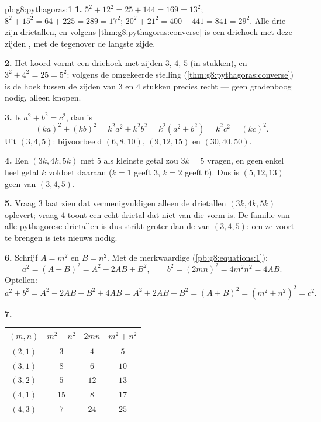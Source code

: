 \begin{solution}{pb:g8:pythagoras:1}
\textbf{1.} $5^2 + 12^2 = 25 + 144 = 169 = 13^2$; \quad
$8^2 + 15^2 = 64 + 225 = 289 = 17^2$; \quad
$20^2 + 21^2 = 400 + 441 = 841 = 29^2$. Alle drie zijn drietallen, en volgens
\cref{thm:g8:pythagoras:converse} is een driehoek met deze zijden ,
met de  tegenover de langste zijde.

\textbf{2.} Het koord vormt een driehoek met zijden $3$, $4$, $5$ (in stukken),
en $3^2 + 4^2 = 25 = 5^2$: volgens de omgekeerde stelling
(\cref{thm:g8:pythagoras:converse}) is de hoek tussen de zijden van $3$ en $4$
stukken precies recht --- geen gradenboog nodig, alleen knopen.

\textbf{3.} Is $a^2 + b^2 = c^2$, dan is
\[
(ka)^2 + (kb)^2 = k^2 a^2 + k^2 b^2
= k^2\left(a^2 + b^2\right) = k^2 c^2 = (kc)^2 .
\]
Uit $(3, 4, 5)$: bijvoorbeeld $(6, 8, 10)$, $(9, 12, 15)$ en $(30, 40, 50)$.

\textbf{4.} Een  $(3k, 4k, 5k)$ met $5$ als kleinste getal zou
$3k = 5$ vragen, en geen enkel heel getal $k$ voldoet daaraan ($k = 1$ geeft $3$,
$k = 2$ geeft $6$). Dus is $(5, 12, 13)$ geen  van $(3, 4, 5)$.

\textbf{5.} Vraag 3 laat zien dat vermenigvuldigen alleen de drietallen
$(3k, 4k, 5k)$ oplevert; vraag 4 toont een echt drietal dat niet van die vorm is.
De familie van alle pythagorese drietallen is dus strikt groter dan de 
van $(3, 4, 5)$: om ze voort te brengen is iets nieuws nodig.

\textbf{6.} Schrijf $A = m^2$ en $B = n^2$. Met de merkwaardige 
(\cref{pb:g8:equations:1}):
\[
a^2 = (A - B)^2 = A^2 - 2AB + B^2,
\qquad
b^2 = (2mn)^2 = 4m^2n^2 = 4AB .
\]
Optellen:
\[
a^2 + b^2 = A^2 - 2AB + B^2 + 4AB
= A^2 + 2AB + B^2 = (A + B)^2
= \left(m^2 + n^2\right)^2 = c^2 .
\]

\textbf{7.}
\begin{center}
\renewcommand{\arraystretch}{1.2}
\begin{tabular}{c|ccc}
$(m, n)$ & $m^2 - n^2$ & $2mn$ & $m^2 + n^2$ \\
\hline
$(2, 1)$ & $3$ & $4$ & $5$ \\
$(3, 1)$ & $8$ & $6$ & $10$ \\
$(3, 2)$ & $5$ & $12$ & $13$ \\
$(4, 1)$ & $15$ & $8$ & $17$ \\
$(4, 3)$ & $7$ & $24$ & $25$ \\
\end{tabular}
\end{center}


\end{solution}
